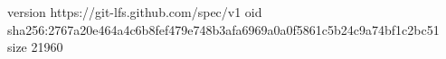 version https://git-lfs.github.com/spec/v1
oid sha256:2767a20e464a4c6b8fef479e748b3afa6969a0a0f5861c5b24c9a74bf1c2bc51
size 21960
